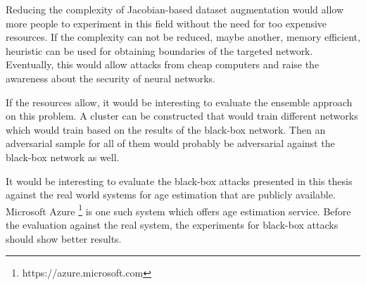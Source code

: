 Reducing the complexity of Jacobian-based dataset augmentation would allow more people to experiment in this field without the need for too expensive resources. If the complexity can not be reduced, maybe another, memory efficient, heuristic can be used for obtaining boundaries of the targeted network. Eventually, this would allow attacks from cheap computers and raise the awareness about the security of neural networks.

If the resources allow, it would be interesting to evaluate the ensemble approach on this problem. A cluster can be constructed that would train different networks which would train based on the results of the black-box network. Then an adversarial sample for all of them would probably be adversarial against the black-box network as well.

It would be interesting to evaluate the black-box attacks presented in this thesis against the real world systems for age estimation that are publicly available. Microsoft Azure \footnote{https://azure.microsoft.com} is one such system which offers age estimation service. Before the evaluation against the real system, the experiments for black-box attacks should show better results.